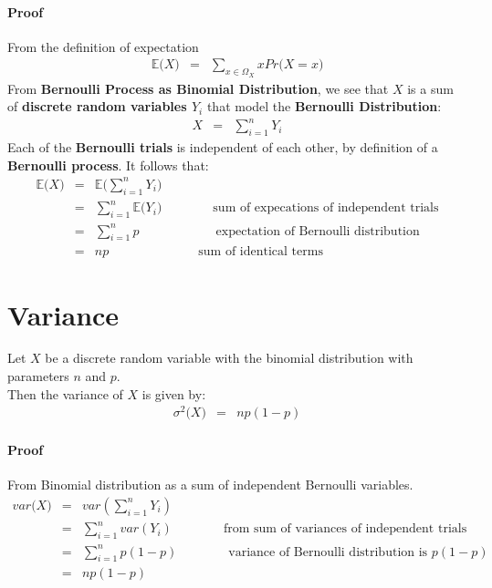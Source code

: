 \paragraph{Proof}
From the definition of expectation
\begin{eqnarray}
\mathbb{E}\big(X\big) &=& \sum_{x \in\Omega_{X}}x Pr\big(X = x\big)
\end{eqnarray}
From \textbf{\color{blue}Bernoulli Process as Binomial Distribution}, we see that $X$ is a sum of \textbf{\color{blue}discrete random variables $Y_{i}$} that model the \textbf{\color{blue}Bernoulli Distribution}:
\begin{eqnarray}
	X &=& \sum_{i = 1}^{n}Y_{i}
\end{eqnarray}
Each of the \textbf{\color{blue}Bernoulli trials} is independent of each other, by definition of a \textbf{\color{blue}Bernoulli process}. It follows that:
\begin{eqnarray}
	\nonumber
	\mathbb{E}\big(X\big) &=& \mathbb{E}\bigg(\sum_{i = 1}^{n}Y_{i}\bigg)\\
	\nonumber
	&=& \sum_{i = 1}^{n}\mathbb{E}\Big(Y_{i}\Big)\qquad\qquad\text{sum of expecations of independent trials}\\
	\nonumber
	&=& \sum_{i = 1}^{n}p\qquad\qquad\qquad\text{expectation of Bernoulli distribution}\\
	&=& np\qquad\qquad\qquad\quad\text{sum of identical terms}
\end{eqnarray}

\section{Variance}
Let $X$ be a discrete random variable with the binomial distribution with parameters $n$ and $p$.\\
Then the variance of $X$ is given by:
\begin{eqnarray}
	\sigma^{2}\big(X\big) &=& np(1 - p)
\end{eqnarray}

\paragraph{Proof}
From Binomial distribution as a sum of independent Bernoulli variables.
\begin{eqnarray}
	\nonumber
	var\big(X\big) &=& var (\sum_{i = 1}^{n}Y_{i})\\
	\nonumber
	&=& \sum_{i = 1}^{n}var(Y_{i})\qquad\qquad\text{from sum of variances of independent trials}\\
	\nonumber
	&=& \sum_{i = 1}^{n}p(1 - p)\qquad\qquad\text{variance of Bernoulli distribution is $p(1 - p)$}\\
	&=& np(1 - p)
\end{eqnarray}